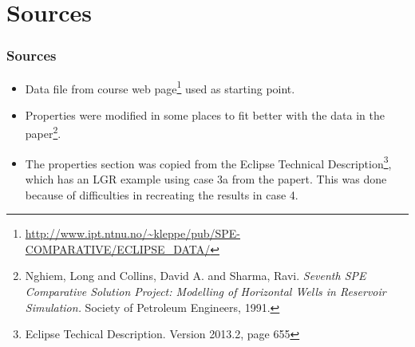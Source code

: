 \section{Sources}

\begin{frame}
    \frametitle{Sources}
    \begin{itemize}
        \item Data file from course web page\footnote{\url{http://www.ipt.ntnu.no/~kleppe/pub/SPE-COMPARATIVE/ECLIPSE_DATA/}} used as starting point.
        \pause
        \item Properties were modified in some places to fit better with the data in the paper\footnote{Nghiem, Long and Collins, David A. and Sharma, Ravi. \emph{Seventh SPE Comparative Solution Project: Modelling of Horizontal Wells in Reservoir Simulation.} Society of Petroleum Engineers, 1991.}.
        \pause
        \item The properties section was copied from the Eclipse Technical Description\footnote{Eclipse Techical Description. Version 2013.2, page 655}, which has an LGR example using case 3a from the papert. This was done because of difficulties in recreating the results in case 4.
    \end{itemize}
\end{frame}
